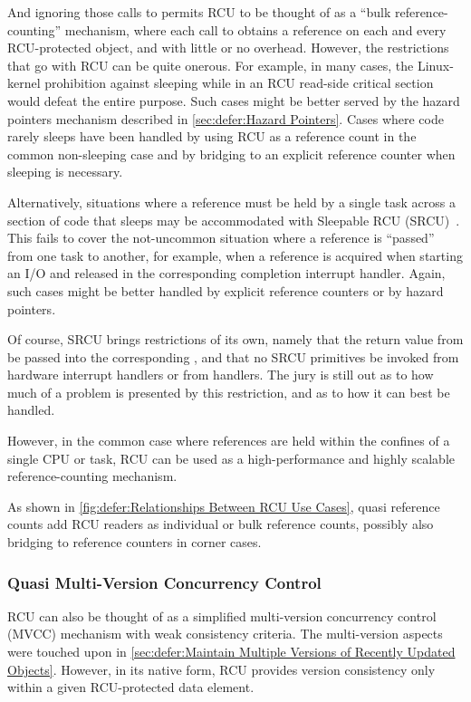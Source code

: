 And ignoring those calls to  permits RCU to be
thought of as a ``bulk reference-counting'' mechanism, where each call
to  obtains a reference on each and every RCU-protected
object, and with little or no overhead.
However, the restrictions that go with RCU can be quite onerous.
For example, in many cases, the Linux-kernel prohibition against
sleeping while in an RCU read-side critical section would defeat the
entire purpose.
Such cases might be better served by the hazard pointers mechanism
described in \cref{sec:defer:Hazard Pointers}.
Cases where code rarely sleeps have been handled by using RCU as a
reference count in the common non-sleeping case and by bridging
to an explicit reference counter when sleeping is necessary.

Alternatively, situations where a reference must be held by a single task
across a section of code that sleeps may be accommodated with Sleepable
RCU (SRCU)~\cite{PaulEMcKenney2006c}.
This fails to cover the not-uncommon situation where a reference is ``passed''
from one task to another, for example, when a reference is acquired
when starting an I/O and released in the corresponding completion
interrupt handler.
Again, such cases might be better handled by explicit reference counters
or by hazard pointers.

Of course, SRCU brings restrictions of its own, namely that the
return value from  be passed into the
corresponding , and that no SRCU primitives
be invoked from hardware interrupt handlers or from 
handlers.
The jury is still out as to how much of a problem is presented by
this restriction, and as to how it can best be handled.

However, in the common case where references are held within the confines
of a single CPU or task, RCU can be used as a high-performance and highly
scalable reference-counting mechanism.

As shown in \cref{fig:defer:Relationships Between RCU Use Cases},
quasi reference counts add RCU readers as individual or bulk
reference counts, possibly also bridging to reference counters
in corner cases.

\subsubsection{Quasi Multi-Version Concurrency Control}
\label{sec:defer:Quasi Multi-Version Concurrency Control}

RCU can also be thought of as a simplified multi-version concurrency
control (MVCC) mechanism with weak consistency criteria.
The multi-version aspects were touched upon in
\cref{sec:defer:Maintain Multiple Versions of Recently Updated Objects}.
However, in its native form, RCU provides version consistency only
within a given RCU-protected data element.

